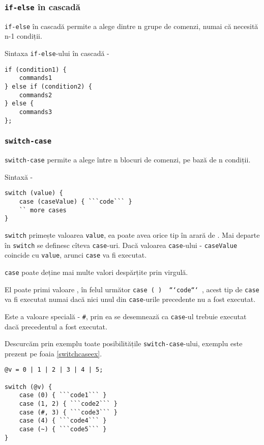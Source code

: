 \subsubsection{\texttt{if-else} în cascadă}

\texttt{if-else} în cascadă permite a alege dintre n grupe de comenzi, numai că necesită n-1 condiții.

Sintaxa \texttt{if-else}-ului în cascadă -
\begin{verbatim}
if (condition1) {
	commands1
} else if (condition2) {
	commands2
} else {
	commands3
};
\end{verbatim}

\subsubsection{\texttt{switch-case}}

\texttt{switch-case} permite a alege între n blocuri de comenzi, pe bază de n condiții.

Sintaxă -
\begin{verbatim}
switch (value) {
	case (caseValue) { ```code``` }
	`` more cases
}
\end{verbatim}

\texttt{switch} primește valoarea \texttt{value}, ea poate avea orice tip în arară de \bool. Mai departe în \texttt{switch} se definesc cîteva \texttt{case}-uri. Dacă valoarea \texttt{case}-ului - \texttt{caseValue} coincide cu \texttt{value}, arunci \texttt{case} va fi executat.

\texttt{case} poate deține mai multe valori despărțite prin virgulă.

El poate primi valoare \void, în felul următor \texttt{case (~) { ```code``` }}, acest tip de \texttt{case} va fi executat numai dacă nici unul din \texttt{case}-urile precedente nu a fost executat.

Este a valoare specială - \texttt{#}, prin ea se desemnează ca \texttt{case}-ul trebuie executat dacă precedentul a fost executat.

Descurcăm prin exemplu toate posibilitățile \texttt{switch-case}-ului, exemplu este prezent pe foaia \ref{switchcaseex}.

\begin{sourcecode}
\label{switchcaseex}
\begin{verbatim}
@v = 0 | 1 | 2 | 3 | 4 | 5;

switch (@v) {
	case (0) { ```code1``` }
	case (1, 2) { ```code2``` }
	case (#, 3) { ```code3``` }
	case (4) { ```code4``` }
	case (~) { ```code5``` }
}
\end{verbatim}
\end{sourcecode}

